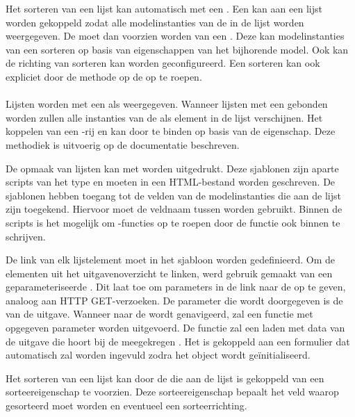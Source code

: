 Het sorteren van een lijst kan automatisch met een .
Een  kan aan een lijst worden gekoppeld zodat alle modelinstanties van de  in de lijst worden weergegeven.
De  moet dan voorzien worden van een .
Deze kan modelinstanties van een  sorteren op basis van eigenschappen van het bijhorende model.
Ook kan de richting van sorteren kan worden geconfigureerd.
Een  sorteren kan ook expliciet door de  methode op de  op te roepen.

\paragraph{\kendo}
Lijsten worden met een  als  weergegeven.
Wanneer lijsten met een  gebonden worden zullen alle instanties van de  als element in de lijst verschijnen.
Het koppelen van een \js-rij en  kan door te binden op basis van de  eigenschap.
Deze methodiek is uitvoerig op de \kendo{} documentatie beschreven.

De opmaak van lijsten kan met \kendo{}  worden uitgedrukt.
Deze sjablonen zijn aparte scripts van het type  en moeten in een HTML-bestand worden geschreven.
De sjablonen hebben toegang tot de velden van de modelinstanties die aan de lijst zijn toegekend.
Hiervoor moet de veldnaam tussen  worden gebruikt.
Binnen de scripts is het mogelijk om \js-functies op te roepen door de functie ook binnen  te schrijven.

De link van elk lijstelement moet in het sjabloon worden gedefinieerd.
Om de elementen uit het uitgavenoverzicht te linken, werd gebruik gemaakt van een geparameteriseerde .
Dit laat toe om parameters in de link naar de  op te geven,  analoog aan HTTP GET-verzoeken.
De parameter die wordt doorgegeven is de  van de uitgave.
Wanneer naar de  wordt genavigeerd, zal een functie met opgegeven parameter worden uitgevoerd.
De functie zal een  laden met data van de uitgave die hoort bij de meegekregen .
Het  is gekoppeld aan een formulier dat automatisch zal worden ingevuld zodra het object wordt geïnitialiseerd.

Het sorteren van een lijst kan door de  die aan de lijst is gekoppeld van een sorteereigenschap te voorzien.
Deze sorteereigenschap bepaalt het veld waarop gesorteerd moet worden en eventueel een sorteerrichting.

